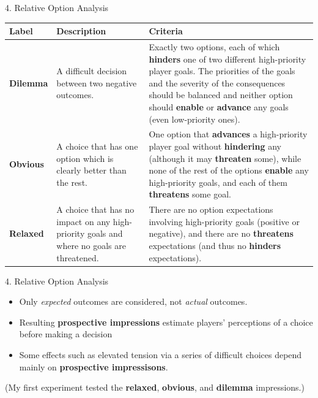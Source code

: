 \documentclass[xcolor=x11names]{beamer}
\begin{document}
\begin{frame}{4. Relative Option Analysis}
\centering
\renewcommand*{\arraystretch}{1.5}
\footnotesize
\hspace*{-1.5em}
\begin{tabular}{p{4.5em}p{10em}p{18.5em}}
\toprule
\textbf{Label} & \textbf{Description} & \textbf{Criteria} \\
\midrule
\textbf{Dilemma} & A difficult decision between two negative outcomes. & Exactly two options, each of which \textbf{hinders} one of two different high-priority player goals. The priorities of the goals and the severity of the consequences should be balanced and neither option should \textbf{enable} or \textbf{advance} any goals (even low-priority ones). \\
\textbf{Obvious} & A choice that has one option which is clearly better than the rest. & One option that \textbf{advances} a high-priority player goal without \textbf{hindering} any (although it may \textbf{threaten} some), while none of the rest of the options \textbf{enable} any high-priority goals, and each of them \textbf{threatens} some goal. \\
\textbf{Relaxed} & A choice that has no impact on any high-priority goals and where no goals are threatened. & There are no option expectations involving high-priority goals (positive or negative), and there are no \textbf{threatens} expectations (and thus no \textbf{hinders} expectations). \\
\bottomrule
\end{tabular}
\end{frame}

\begin{frame}{4. Relative Option Analysis}
  \vfill
  \begin{itemize}\addtolength{\itemsep}{0.5\baselineskip}
    \item Only \emph{expected} outcomes are considered, not \emph{actual} outcomes.
    \item Resulting \textbf{prospective impressions} estimate players' perceptions of a choice before making a decision
    \item Some effects such as elevated tension via a series of difficult choices depend mainly on \textbf{prospective impressisons}.
  \end{itemize}
  \vfill
  \centering
  \scriptsize (My first experiment tested the \textbf{relaxed}, \textbf{obvious}, and \textbf{dilemma} impressions.)
\end{frame}
\end{document}

